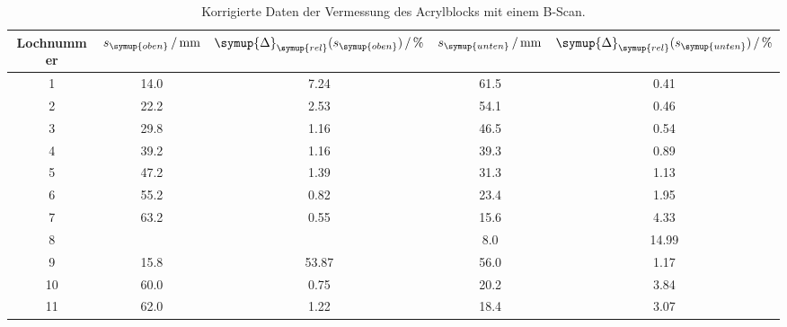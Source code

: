   \begin{table}[H]
    \centering
    \caption{Korrigierte Daten der Vermessung des Acrylblocks mit einem B-Scan.}
    \label{tab:b-scan_korr}
    \begin{tabular}{S[table-format=2.0] S[table-format=2.1] S[table-format=2.2] S[table-format=2.1] S[table-format=2.2]}
        \toprule
         {Lochnummer} & {$s_{\symup{oben}}\,/\,\unit{\milli\metre}$} & {$\symup{\Delta}_{\symup{rel}}(s_{\symup{oben}})\,/\,\unit{\percent}$} & %
         {$s_{\symup{unten}}\,/\,\unit{\milli\metre}$} & {$\symup{\Delta}_{\symup{rel}}(s_{\symup{unten}})\,/\,\unit{\percent}$} \\
        	& 14.0 &  7.24 & 61.5 &  0.41 \\
         2	& 22.2 &  2.53 & 54.1 &  0.46 \\
         3	& 29.8 &  1.16 & 46.5 &  0.54 \\
         4	& 39.2 &  1.16 & 39.3 &  0.89 \\
         5	& 47.2 &  1.39 & 31.3 &  1.13 \\
         6	& 55.2 &  0.82 & 23.4 &  1.95 \\
         7	& 63.2 &  0.55 & 15.6 &  4.33 \\
         8	&  {}  &  {}   &  8.0 & 14.99 \\
         9	& 15.8 & 53.87 & 56.0 &  1.17 \\
         10	& 60.0 &  0.75 & 20.2 &  3.84 \\
         11	& 62.0 &  1.22 & 18.4 &  3.07 \\
        \bottomrule 
    \end{tabular}
  \end{table}
  
  
  
  
  
  
  
  
  
  
  
  
  
  
  
  
  
  
  
  
  
  
  
  
  
  
  
  
  
  
  
  
  
  
  
  
  
  
  
  
  
  



































